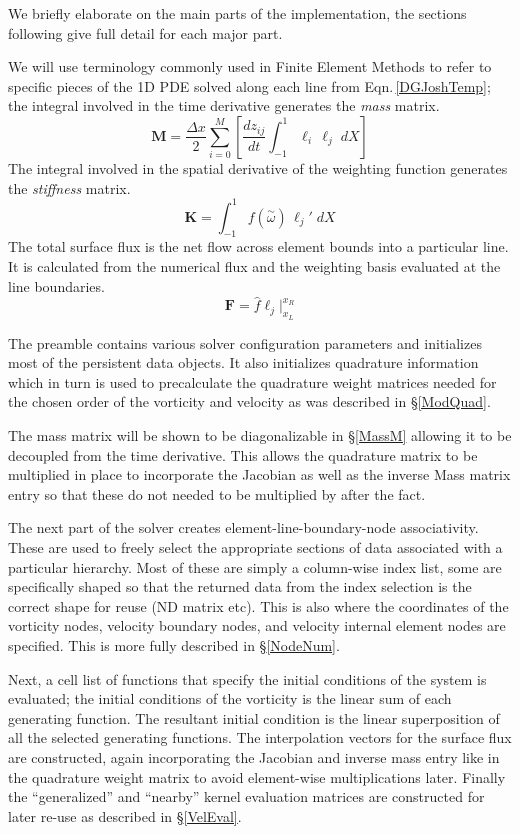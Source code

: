 \documentclass[letterpaper,12pt]{report}
\newcommand{\be}{\begin{equation}}
\newcommand{\ee}{\end{equation}}
\newcommand{\aomega}{\overset{\sim}{\omega}}				%
\begin{document}
We briefly elaborate on the main parts of the implementation, the sections following give full detail for each major part.

We will use terminology commonly used in Finite Element Methods to refer to specific pieces of the 1D PDE solved along each line from Eqn.\,\eqref{DGJoshTemp}; the integral involved in the time derivative generates the \textit{mass} matrix.
\be \boldsymbol{M} = \frac{\Delta x}{2} \sum_{i=0}^M \left[ \frac{d z_{ij}}{dt}	\int_{-1}^{1}\ell_i  \, \ell_j \;dX \right] \ee
The integral involved in the spatial derivative of the weighting function generates the \textit{stiffness} matrix.
\be \boldsymbol{K} = \int_{-1}^{1} f(\aomega) \, \ell_j' \;dX \ee
The total surface flux is the net flow across element bounds into a particular line. It is calculated from the numerical flux and the weighting basis evaluated at the line boundaries.
\be \boldsymbol{F} = \hat{f}\ell_j \Big|^{x_R}_{x_L} \ee

The preamble contains various solver configuration parameters and initializes most of the persistent data objects. It also initializes quadrature information which in turn is used to precalculate the quadrature weight matrices needed for the chosen order of the vorticity and velocity as was described in \S\ref{ModQuad}.

The mass matrix will be shown to be diagonalizable in \S\ref{MassM} allowing it to be decoupled from the time derivative. This allows the quadrature matrix to be multiplied in place to incorporate the Jacobian as well as the inverse Mass matrix entry so that these do not needed to be multiplied by after the fact. 

The next part of the solver creates element-line-boundary-node associativity. These are used to freely select the appropriate sections of data associated with a particular hierarchy. Most of these are simply a column-wise index list, some are specifically shaped so that the returned data from the index selection is the correct shape for reuse (ND matrix etc). This is also where the coordinates of the vorticity nodes, velocity boundary nodes, and velocity internal element nodes are specified. This is more fully described in \S\ref{NodeNum}.

Next, a cell list of functions that specify the initial conditions of the system is evaluated; the initial conditions of the vorticity is the linear sum of each generating function. The resultant initial condition is the linear superposition of all the selected generating functions. The interpolation vectors for the surface flux are constructed, again incorporating the Jacobian and inverse mass entry like in the quadrature weight matrix to avoid element-wise multiplications later. Finally the ``generalized'' and ``nearby'' kernel evaluation matrices are constructed for later re-use as described in \S\ref{VelEval}.
\end{document}

